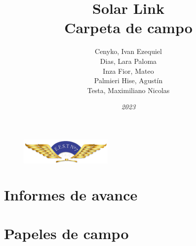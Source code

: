 \documentclass{ol-softwaremanual}
\renewcommand{\listoflistingscaption}{List of Code Listings}
\begin{document}
\begin{figure}[b]
\centering
\includegraphics[width=0.4\textwidth]{main/logo-impa.png}
\end{figure}


\title{Solar Link \\ Carpeta de campo}
\author{Cenyko, Ivan Ezequiel \\ Dias, Lara Paloma \\ Inza Fior, Mateo \\ Palmieri Hise, Agustín \\ Testa, Maximiliano Nicolas}
\date{\textit{2023}}

\maketitle

\tableofcontents
\renewcommand\listoflistingscaption{Lista de códigos}
\listoflistings %
\newpage

\section{Informes de avance}



\section{Papeles de campo}
\end{document}
